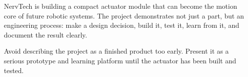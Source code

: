 \documentclass[public]{nervtech-overview}
\begin{document}
\begin{plainstakeholderbox}
NervTech is building a compact actuator module that can become the motion core of future robotic systems. The project demonstrates not just a part, but an engineering process: make a design decision, build it, test it, learn from it, and document the result clearly.
\end{plainstakeholderbox}

\begin{riskbox}
Avoid describing the project as a finished product too early. Present it as a serious prototype and learning platform until the actuator has been built and tested.
\end{riskbox}
\end{document}
